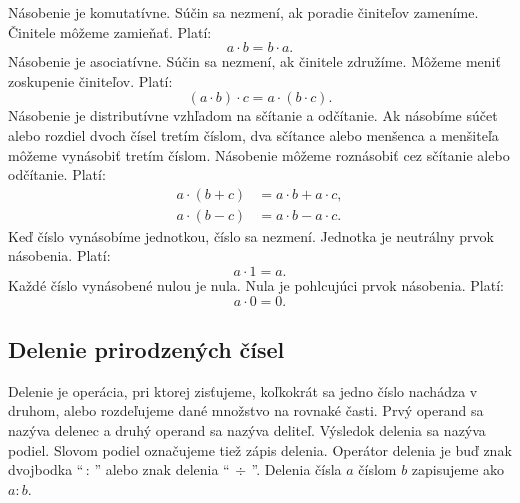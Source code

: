 \documentclass{report}
\begin{document}
Násobenie je komutatívne. Súčin sa nezmení, ak poradie činiteľov zameníme. Činitele môžeme zamieňať. Platí:
\[
a \cdot b = b \cdot a.
\]
Násobenie je asociatívne. Súčin sa nezmení, ak činitele združíme. Môžeme meniť zoskupenie činiteľov. Platí:
\[
(a \cdot b) \cdot c = a \cdot (b \cdot c).
\]
Násobenie je distributívne vzhľadom na sčítanie a odčítanie. Ak násobíme súčet alebo rozdiel dvoch čísel tretím číslom, dva sčítance alebo menšenca a menšiteľa môžeme vynásobiť tretím číslom. Násobenie môžeme roznásobiť cez sčítanie alebo odčítanie. Platí:
\[
\begin{aligned}
  a \cdot (b + c) &= a \cdot b + a \cdot c, \\
  a \cdot (b - c) &= a \cdot b - a \cdot c.
\end{aligned}
\]
Keď číslo vynásobíme jednotkou, číslo sa nezmení. Jednotka je neutrálny prvok násobenia. Platí:
\[
a \cdot 1 = a.
\]
Každé číslo vynásobené nulou je nula. Nula je pohlcujúci prvok násobenia. Platí:
\[
a \cdot 0 = 0.
\]

\subsection{Delenie prirodzených čísel}

Delenie je operácia, pri ktorej zisťujeme, koľkokrát sa jedno číslo nachádza v druhom, alebo rozdeľujeme dané množstvo na rovnaké časti. Prvý operand sa nazýva delenec a druhý operand sa nazýva deliteľ. Výsledok delenia sa nazýva podiel. Slovom podiel označujeme tiež zápis delenia. Operátor delenia je buď znak dvojbodka \enquote{\(\, :\, \)} alebo znak delenia \enquote{\(\, \div \,\)}. Delenia čísla \(a\) číslom \(b\) zapisujeme ako \(a : b\).
\end{document}
